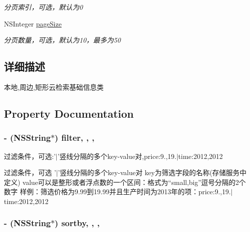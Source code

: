 \begin{DoxyCompactItemize}
\begin{DoxyCompactList}\small\item\em 分页索引，可选，默认为0 \end{DoxyCompactList}\item 
\hypertarget{interface_b_m_k_cloud_search_info_ab625992f8620205a6b24a1490a999fde}{N\-S\-Integer \hyperlink{interface_b_m_k_cloud_search_info_ab625992f8620205a6b24a1490a999fde}{page\-Size}}\label{interface_b_m_k_cloud_search_info_ab625992f8620205a6b24a1490a999fde}

\begin{DoxyCompactList}\small\item\em 分页数量，可选，默认为10，最多为50 \end{DoxyCompactList}\end{DoxyCompactItemize}


\subsection{详细描述}
本地,周边,矩形云检索基础信息类 

\subsection{Property Documentation}
\hypertarget{interface_b_m_k_cloud_search_info_a65d91501d19f2a6aa027de6f9e5bc837}{
\subsubsection[{filter}]{\setlength{\rightskip}{0pt plus 5cm}-\/ (N\-S\-String$\ast$) filter\hspace{0.3cm}{\ttfamily [read]}, {\ttfamily [write]}, {\ttfamily [nonatomic]}, {\ttfamily [retain]}}}\label{interface_b_m_k_cloud_search_info_a65d91501d19f2a6aa027de6f9e5bc837}


过滤条件，可选\-:'$|$'竖线分隔的多个key-\/value对,price\-:9.,19.$|$time\-:2012,2012 

过滤条件，可选 '$|$'竖线分隔的多个key-\/value对 key为筛选字段的名称(存储服务中定义) value可以是整形或者浮点数的一个区间：格式为“small,big”逗号分隔的2个数字 样例：筛选价格为9.99到19.99并且生产时间为2013年的项：price\-:9.,19.$|$time\-:2012,2012 \hypertarget{interface_b_m_k_cloud_search_info_ab0d42d1b9e841c5e538e457e819a07f7}{
\subsubsection[{sortby}]{\setlength{\rightskip}{0pt plus 5cm}-\/ (N\-S\-String$\ast$) sortby\hspace{0.3cm}{\ttfamily [read]}, {\ttfamily [write]}, {\ttfamily [nonatomic]}, {\ttfamily [retain]}}}\label{interface_b_m_k_cloud_search_info_ab0d42d1b9e841c5e538e457e819a07f7}


